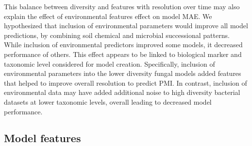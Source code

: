 \documentclass[
  10pt,
  letterpaper,
]{article}
\begin{document}
This balance between diversity and features with resolution over time
may also explain the effect of environmental features effect on model
MAE. We hypothesized that inclusion of environmental parameters would
improve all model predictions, by combining soil chemical and microbial
successional patterns. While inclusion of environmental predictors
improved some models, it decreased performance of others. This effect
appears to be linked to biological marker and taxonomic level considered
for model creation. Specifically, inclusion of environmental parameters
into the lower diversity fungal models added features that helped to
improve overall resolution to predict PMI. In contrast, inclusion of
environmental data may have added additional noise to high diversity
bacterial datasets at lower taxonomic levels, overall leading to
decreased model performance.

\subsection{Model features}\label{model-features}
\end{document}
